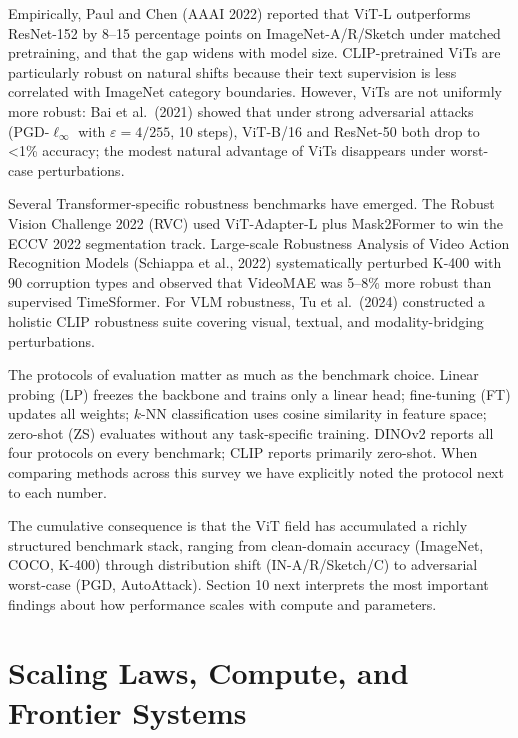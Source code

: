 \documentclass{article}
\begin{document}
Empirically, Paul and Chen (AAAI 2022) reported that ViT-L outperforms ResNet-152 by 8--15 percentage points on ImageNet-A/R/Sketch under matched pretraining, and that the gap widens with model size. CLIP-pretrained ViTs are particularly robust on natural shifts because their text supervision is less correlated with ImageNet category boundaries. However, ViTs are not uniformly more robust: Bai et al.~(2021) showed that under strong adversarial attacks (PGD-\(\ell_\infty\) with \(\varepsilon = 4/255\), 10 steps), ViT-B/16 and ResNet-50 both drop to \textless1\% accuracy; the modest natural advantage of ViTs disappears under worst-case perturbations.

Several Transformer-specific robustness benchmarks have emerged. The Robust Vision Challenge 2022 (RVC) used ViT-Adapter-L plus Mask2Former to win the ECCV 2022 segmentation track. Large-scale Robustness Analysis of Video Action Recognition Models (Schiappa et al., 2022) systematically perturbed K-400 with 90 corruption types and observed that VideoMAE was 5--8\% more robust than supervised TimeSformer. For VLM robustness, Tu et al.~(2024) constructed a holistic CLIP robustness suite covering visual, textual, and modality-bridging perturbations.

The protocols of evaluation matter as much as the benchmark choice. Linear probing (LP) freezes the backbone and trains only a linear head; fine-tuning (FT) updates all weights; \(k\)-NN classification uses cosine similarity in feature space; zero-shot (ZS) evaluates without any task-specific training. DINOv2 reports all four protocols on every benchmark; CLIP reports primarily zero-shot. When comparing methods across this survey we have explicitly noted the protocol next to each number.

The cumulative consequence is that the ViT field has accumulated a richly structured benchmark stack, ranging from clean-domain accuracy (ImageNet, COCO, K-400) through distribution shift (IN-A/R/Sketch/C) to adversarial worst-case (PGD, AutoAttack). Section 10 next interprets the most important findings about how performance scales with compute and parameters.

\section{Scaling Laws, Compute, and Frontier Systems}\label{scaling-laws-compute-and-frontier-systems}
\end{document}
